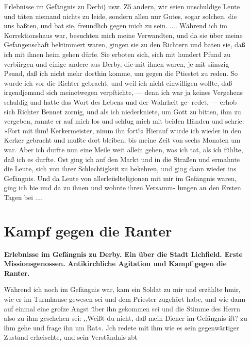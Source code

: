 Erlebnisse im Gefängnis zu Derbi) usw. Z5
andern, wir seien unschuldige Leute und täten niemand nichts zu
leide, sondern allen nur Gutes, sogar solchen, die uns haßten,
und bat sie, freundlich gegen mich zu sein. ....
Während ich im Korrektionshaus war, besuchten mich meine
Verwandten, und da sie über meine Gefangenschaft bekümmert
waren, gingen sie zu den Richtern und baten sie, daß ich mit
ihnen heim gehen dürfe. Sie erboten sich, sich mit hundert Pfund
zu verbiirgen und einige andere aus Derby, die mit ihnen waren,
je mit siinszig Psund, daß ich nicht mehr dorthin komme, um
gegen die Ptiestet zu reden. So wurde ich vor die Richter
gebracht, und weil ich nicht einwilligen wollte, daß irgendjemand
sich meinetwegen verpftichte, — denn ich war ja keines Vergehens
schuldig und hatte das Wort des Lebens und der Wahrheit ge-
redet, — erhob sich Richter Bennet zornig, und als ich niederkniete, um
Gott zu bitten, ihm zu vergeben, rannte er auf mich los und schlug
mich mit beiden Händen und schrie: »Fort mit ihm! Kerkermeister,
nimm ihn fort!« Hierauf wurde ich wieder in den Kerker gebracht
und mußte dort bleiben, bis meine Zeit von sechs Monaten um
war. Aber ich durfte nun eine Meile weit allein gehen, was ich
tat, als ich fühlte, daß ich es durfte. Ost ging ich auf den Markt
und in die Straßen und ermahnte die Leute, sich von ihrer
Schlechtigkeit zu bekehren, und ging dann wieder ins Gefängnis.
Und da Leute von allerleiislteligionen mit mir im Gefängnis
waren, ging ich hie und da zu ihnen und wohnte ihren Versamm-
lungen an den Ersten Tagen bei ....

\chapter[Kampf gegen die Ranter]{Kampf gegen die Ranter}

\begin{center}
\textbf{Erlebnisse im Gefängnis zu Derby. Ein  
über die Stadt
Lichfield. Erste Missionsgenossen. Antikirchliche 
Agitation und Kampf gegen die Ranter.}
\end{center}


Während ich noch im Gefängnis war, kam ein Soldat zu
mir und erzählte hmir, wie er im Turmhause gewesen sei und dem
Priester zugehört habe, und wie dann auf einmal eine grofze Angst
über ihn gekommen sei und die Stimme des Herrn also zu ihm
geschehen sei: ,,Weißt du nicht, daß mein Diener im Gefängnis
ift? zu ihm gehe und frage ihn um Rat«. Jch redete mit ihm
wie es sein gegenwärtiger Zustand erheischte, und sein Verständnis
zbt


